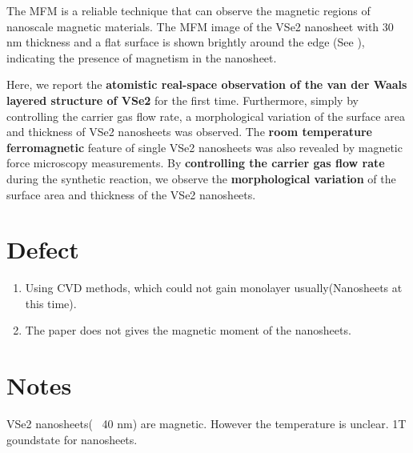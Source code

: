 The MFM is a reliable technique that can observe the magnetic regions of nanoscale magnetic materials. The MFM image of the VSe2 nanosheet with 30 nm thickness and a flat surface is shown brightly around the edge (See ), indicating the presence of magnetism in the nanosheet.

Here, we report the \textbf{atomistic real-space observation of the van der Waals layered structure of VSe2} for the first time. Furthermore, simply by controlling the carrier gas flow rate, a morphological variation of the surface area and thickness of VSe2 nanosheets was observed. The \textbf{room temperature ferromagnetic} feature of single VSe2 nanosheets was also revealed by magnetic force microscopy measurements. By \textbf{controlling the carrier gas flow rate} during the synthetic reaction, we observe the \textbf{morphological variation} of the surface area and thickness of the VSe2 nanosheets.

\section{Defect}

\begin{enumerate}
    \item Using CVD methods, which could not gain monolayer usually(Nanosheets at this time).
    \item The paper does not gives the magnetic moment of the nanosheets.
\end{enumerate}

\section{Notes}
VSe2 nanosheets(~ 40 nm) are magnetic. However the temperature is unclear. 1T goundstate for nanosheets.